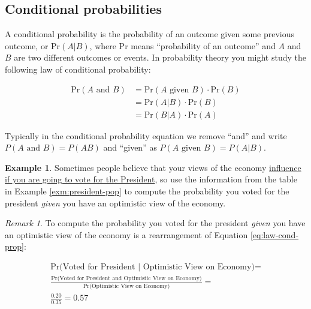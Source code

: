 \documentclass[
]{book}
\theoremstyle{definition}
\theoremstyle{definition}
\newtheorem{example}{Example}[chapter]
\theoremstyle{definition}
\theoremstyle{remark}
\newtheorem*{remark}{Remark}
\begin{document}
\hypertarget{conditional-probabilities}{%
\subsection{Conditional probabilities}\label{conditional-probabilities}}

A conditional probability is the probability of an outcome given some previous outcome, or \(\mbox{Pr} (A | B)\), where Pr means ``probability of an outcome'' and \(A\) and \(B\) are two different outcomes or events. In probability theory you might study the following law of conditional probability:

\begin{equation}
\begin{split}\label{eq:law-cond-prop}
\mbox{Pr}(A \mbox { and } B) &= \mbox{Pr} (A \mbox{ given } B) \cdot  \mbox{Pr}(B) \\
 &= \mbox{Pr} (A | B) \cdot  \mbox{Pr}(B) \\
  &= \mbox{Pr} (B | A) \cdot  \mbox{Pr}(A)
\end{split}
\end{equation}

Typically in the conditional probability equation we remove ``and'' and write \(P(A \mbox{ and } B) = P(AB)\) and ``given'' as \(P(A \mbox{ given } B) = P(A|B)\).

\begin{example}
\protect\hypertarget{exm:unnamed-chunk-176}{}{\label{exm:unnamed-chunk-176} }Sometimes people believe that your views of the economy \href{https://www.cbsnews.com/news/how-much-impact-can-a-president-have-on-the-economy/}{influence if you are going to vote for the President}, so use the information from the table in Example \ref{exm:president-pop} to compute the probability you voted for the president \emph{given} you have an optimistic view of the economy.
\end{example}

\begin{remark}
{}To compute the probability you voted for the president \emph{given} you have an optimistic view of the economy is a rearrangement of Equation \eqref{eq:law-cond-prop}:

\begin{equation}
\begin{split}\label{eq:econ-cond-prop}
\mbox{Pr(Voted for President | Optimistic View on Economy)} = \\
\frac{\mbox{Pr(Voted for President and Optimistic View on Economy)}}{\mbox{Pr(Optimistic View on Economy)}} = \\
\frac{0.20}{0.35} = 0.57
\end{split}
\end{equation}
\end{remark}
\end{document}
